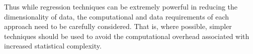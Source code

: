 Thus while regression techniques can be extremely powerful in reducing the dimensionality of data, the computational and data requirements of each approach need to be carefully considered. That is, where possible, simpler techniques should be used to avoid the computational overhead associated with increased statistical complexity.


